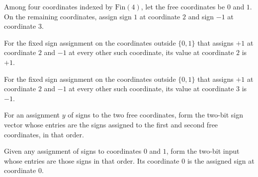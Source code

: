 \begin{definition}
\label{FABL.example3_19FixedAssignment}
\leanok
{}
Among four coordinates indexed by $\mathrm{Fin}(4)$, let the free coordinates be $0$ and
$1$. On the remaining coordinates, assign sign $1$ at coordinate $2$ and sign $-1$ at
coordinate $3$.
\end{definition}

\begin{theorem}
\label{FABL.example3_19FixedAssignment_two}
\leanok
{}
For the fixed sign assignment on the coordinates outside $\{0,1\}$ that assigns $+1$ at
coordinate $2$ and $-1$ at every other such coordinate, its value at coordinate $2$ is
$+1$.
\end{theorem}

\begin{theorem}
\label{FABL.example3_19FixedAssignment_three}
\leanok
{}
For the fixed sign assignment on the coordinates outside $\{0,1\}$ that assigns $+1$ at
coordinate $2$ and $-1$ at every other such coordinate, its value at coordinate $3$ is
$-1$.
\end{theorem}

\begin{definition}
\label{FABL.example3_19TwoBitInput}
\leanok
{}
For an assignment $y$ of signs to the two free coordinates, form the two-bit sign vector
whose entries are the signs assigned to the first and second free coordinates, in that
order.
\end{definition}

\begin{theorem}
\label{FABL.example3_19TwoBitInput_zero}
\leanok
{}
Given any assignment of signs to coordinates $0$ and $1$, form the two-bit input whose
entries are those signs in that order. Its coordinate $0$ is the assigned sign at
coordinate $0$.
\end{theorem}

